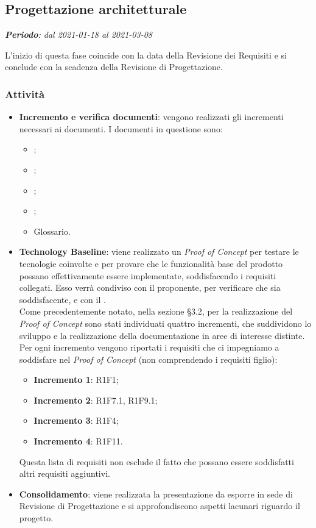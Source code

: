 \subsection{Progettazione architetturale}
\textit{\textbf{Periodo}: dal 2021-01-18 al 2021-03-08}

L'inizio di questa fase coincide con la data della Revisione dei Requisiti e si conclude con la scadenza della Revisione di Progettazione.

\subsubsection{Attività}

\begin{itemize}
\item \textbf{Incremento e verifica documenti}: vengono realizzati gli incrementi necessari ai documenti. I documenti in questione sono:
\begin{itemize}
\item \NdP{};
\item \AdR{};
\item \PdQ{};
\item \PdP{};
\item Glossario.
\end{itemize}
\item \textbf{Technology Baseline}: viene realizzato un \textit{Proof of Concept} per testare le tecnologie coinvolte e per provare che le funzionalità base del prodotto possano effettivamente essere implementate, soddisfacendo i requisiti collegati. Esso verrà condiviso con il proponente, per verificare che sia soddisfacente, e con il \CR{}.\\ Come precedentemente notato, nella sezione \S{3.2}, per la realizzazione del \textit{Proof of Concept} sono stati individuati quattro incrementi, che suddividono lo sviluppo e la realizzazione della documentazione in aree di interesse distinte. Per ogni incremento vengono riportati i requisiti che ci impegniamo a soddisfare nel \textit{Proof of Concept} (non comprendendo i requisiti figlio):
\begin{itemize}
\item \textbf{Incremento 1}: R1F1;
\item \textbf{Incremento 2}: R1F7.1, R1F9.1;
\item \textbf{Incremento 3}: R1F4;
\item \textbf{Incremento 4}: R1F11.
\end{itemize}
Questa lista di requisiti non esclude il fatto che possano essere soddisfatti altri requisiti aggiuntivi.
\item \textbf{Consolidamento}: viene realizzata la presentazione da esporre in sede di Revisione di Progettazione e si approfondiscono aspetti lacunari riguardo il progetto.
\end{itemize}

